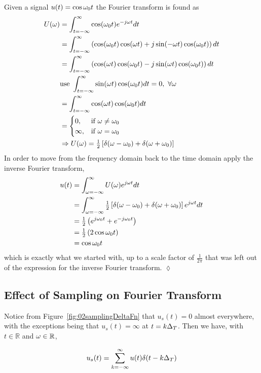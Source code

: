 \begin{example}
Given a signal $u(t)=\cos\omega_0 t$ the Fourier transform is found as
\begin{align*}
U(\omega) &= \int_{t=-\infty}^\infty \cos(\omega_0 t)e^{-j\omega t}dt \\
&= \int_{t=-\infty}^\infty \left(\cos(\omega_0 t)\cos(\omega t) + j\sin(-\omega t)\cos(\omega_0 t)\right)dt \\
&= \int_{t=-\infty}^\infty \left(\cos(\omega t)\cos(\omega_0 t) - j\sin(\omega t)\cos(\omega_0 t)\right)dt \\
&\text{use }\int_{t=-\infty}^\infty \sin(\omega t)\cos(\omega_0 t)dt = 0,~\forall \omega \\
&= \int_{t=-\infty}^\infty \cos(\omega t)\cos(\omega_0 t)dt \\
&= \begin{cases} 0, & \text{if } \omega \neq \omega_0 \\ \infty, & \text{if } \omega = \omega_0 \end{cases} \\
&\Rightarrow U(\omega) = \tfrac{1}{2} \left[\delta(\omega-\omega_0) + \delta(\omega+\omega_0)\right]
\end{align*}
In order to move from the frequency domain back to the time domain apply the inverse Fourier transform,
\begin{align*}
u(t) &= \int_{\omega=-\infty}^\infty U(\omega)e^{j\omega t}dt \\
&= \int_{\omega=-\infty}^\infty \tfrac{1}{2} \left[\delta(\omega-\omega_0) + \delta(\omega+\omega_0)\right] e^{j\omega t}dt \\
&= \tfrac{1}{2}\left(e^{j\omega_0 t} + e^{-j\omega_0 t}\right) \\
&= \tfrac{1}{2}\left(2\cos\omega_0 t\right) \\
&= \cos\omega_0 t
\end{align*}
which is exactly what we started with, up to a scale factor of $\frac{1}{2\pi}$ that was left out of the expression for the inverse Fourier transform.
$\lozenge$
\end{example}

\subsection{Effect of Sampling on Fourier Transform}
Notice from Figure~\ref{fig:02samplingDeltaFn} that $u_s(t) = 0$ almost everywhere, with the exceptions being that $u_s(t) = \infty$ at $t=k\Delta_T$.
Then we have, with $t\in\mathbb{R}$ and $\omega\in\mathbb{R}$,

\begin{equation*}
u_s(t) = \sum_{k=-\infty}^\infty u(t)\delta(t-k\Delta_T)
\end{equation*}

